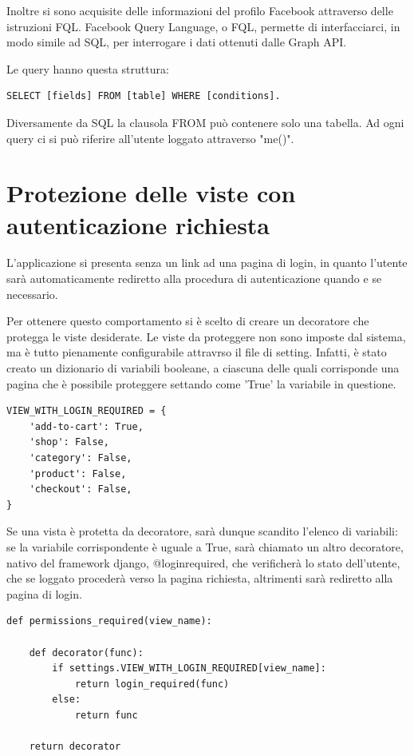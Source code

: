 Inoltre si sono acquisite delle informazioni del profilo Facebook attraverso delle istruzioni FQL. Facebook Query Language, o FQL, permette di interfacciarci, in modo simile ad SQL, per interrogare i dati ottenuti dalle Graph API.

Le query hanno questa struttura: 
\begin{lstlisting}
SELECT [fields] FROM [table] WHERE [conditions]. 
\end{lstlisting}
Diversamente da SQL la clausola FROM può contenere solo una tabella. Ad ogni query ci si può riferire all'utente loggato attraverso "me()". 

\section{Protezione delle viste con autenticazione richiesta}\label{decorators}
L'applicazione si presenta senza un link ad una pagina di login, in quanto l'utente sarà automaticamente rediretto alla procedura di autenticazione quando e se necessario. 

Per ottenere questo comportamento si è scelto di creare un decoratore che protegga le viste desiderate.
Le viste da proteggere non sono imposte dal sistema, ma è tutto pienamente configurabile attravrso il file di setting. Infatti, è stato creato un dizionario di variabili booleane, a ciascuna delle quali corrisponde una pagina che è possibile proteggere settando come 'True' la variabile in questione.


\begin{lstlisting}
VIEW_WITH_LOGIN_REQUIRED = {
    'add-to-cart': True,
    'shop': False,
    'category': False,
    'product': False,
    'checkout': False,
}
\end{lstlisting}


Se una vista è protetta da decoratore, sarà dunque scandito l'elenco di variabili: se la variabile corrispondente è uguale a True, sarà chiamato un altro decoratore, nativo del framework django, @login\textunderscore required, che verificherà lo stato dell'utente, che se loggato procederà verso la pagina richiesta, altrimenti sarà rediretto alla pagina di login.

\begin{lstlisting}
def permissions_required(view_name):
    
    def decorator(func):
        if settings.VIEW_WITH_LOGIN_REQUIRED[view_name]:
            return login_required(func)
        else:
            return func

    return decorator
\end{lstlisting}

